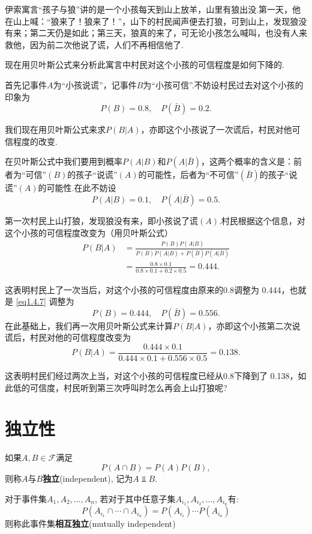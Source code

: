 \begin{example}
    伊索寓言“孩子与狼”讲的是一个小孩每天到山上放羊，山里有狼出没.第一天，他在山上喊：“狼来了！狼来了！”，山下的村民闻声便去打狼，可到山上，发现狼没有来；第二天仍是如此；第三天，狼真的来了，可无论小孩怎么喊叫，也没有人来救他，因为前二次他说了谎，人们不再相信他了.
\end{example}

现在用贝叶斯公式来分析此寓言中村民对这个小孩的可信程度是如何下降的.

首先记事件$A$为“小孩说谎”，记事件$B$为“小孩可信”.不妨设村民过去对这个小孩的印象为
\begin{equation}\label{eq1.4.7}
    P(B) = 0.8,\quad P(\bar B) = 0.2.
\end{equation}

我们现在用贝叶斯公式来求$P(B|A)$，亦即这个小孩说了一次谎后，村民对他可信程度的改变.

在贝叶斯公式中我们要用到概率$P(A|B)$和$P(A|\bar B)$，这两个概率的含义是：前者为“可信”$(B)$的孩子“说谎”$(A)$的可能性，后者为“不可信”$(\bar B)$的孩子“说谎”$(A)$的可能性.在此不妨设
\[
    P(A|B) = 0.1,\quad P(A|\bar B) = 0.5.
\]

第一次村民上山打狼，发现狼没有来，即小孩说了谎$(A)$.村民根据这个信息，对这个小孩的可信程度改变为（用贝叶斯公式）
\begin{align*}
    P(B|A) & = \frac{P(B)P(A|B)}{P(B)P(A|B) + P(\bar B)P(A|\bar B) }     \\
           & = \frac{0.8\times0.1}{0.8\times0.1 + 0.2\times0.5} = 0.444.
\end{align*}

这表明村民上了一次当后，对这个小孩的可信程度由原来的0.8调整为
0.444，也就是 \eqref{eq1.4.7} 调整为
\begin{equation}\label{eq1.4.8}
    P(B) = 0.444,\quad P(\bar B) = 0.556.
\end{equation}
在此基础上，我们再一次用贝叶斯公式来计算$P(B|A)$，亦即这个小孩第二次说谎后，村民对他的可信程度改变为
\[
    P(B|A) = \frac{0.444\times0.1}{0.444\times0.1 + 0.556\times0.5} = 0.138.
\]

这表明村民们经过两次上当，对这个小孩的可信程度已经从0.8下降到了
0.138，如此低的可信度，村民听到第三次呼叫时怎么再会上山打狼呢?

\section{独立性}

\begin{definition}[事件的独立性]
    如果$A,B\in\mathscr{F}$满足
    \[ P(A\cap B) = P(A)P(B), \]
    则称$A$与$B$\textbf{独立}(independent), 记为$A \Vbar B$.

    对于事件集$A_1, A_2, \dotsc, A_n$, 若对于其中任意子集$A_{i_1}, A_{i_2}, \dotsc, A_{i_n}$有:
    \[ P(A_{i_1} \cap \cdots  \cap A_{i_n}) =P(A_{i_1})\cdots P(A_{i_n})  \]
    则称此事件集\textbf{相互独立}(mutually independent)
\end{definition}

